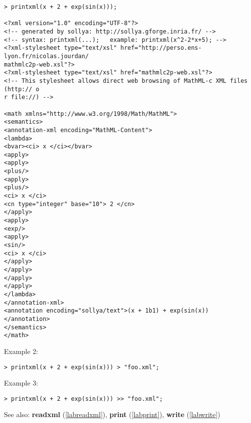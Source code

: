 \begin{center}\begin{minipage}{15cm}\begin{Verbatim}[frame=single]
> printxml(x + 2 + exp(sin(x)));

<?xml version="1.0" encoding="UTF-8"?>
<!-- generated by sollya: http://sollya.gforge.inria.fr/ -->
<!-- syntax: printxml(...);   example: printxml(x^2-2*x+5); -->
<?xml-stylesheet type="text/xsl" href="http://perso.ens-lyon.fr/nicolas.jourdan/
mathmlc2p-web.xsl"?>
<?xml-stylesheet type="text/xsl" href="mathmlc2p-web.xsl"?>
<!-- This stylesheet allows direct web browsing of MathML-c XML files (http:// o
r file://) -->

<math xmlns="http://www.w3.org/1998/Math/MathML">
<semantics>
<annotation-xml encoding="MathML-Content">
<lambda>
<bvar><ci> x </ci></bvar>
<apply>
<apply>
<plus/>
<apply>
<plus/>
<ci> x </ci>
<cn type="integer" base="10"> 2 </cn>
</apply>
<apply>
<exp/>
<apply>
<sin/>
<ci> x </ci>
</apply>
</apply>
</apply>
</apply>
</lambda>
</annotation-xml>
<annotation encoding="sollya/text">(x + 1b1) + exp(sin(x))</annotation>
</semantics>
</math>

\end{Verbatim}
\end{minipage}\end{center}
\noindent Example 2: 
\begin{center}\begin{minipage}{15cm}\begin{Verbatim}[frame=single]
> printxml(x + 2 + exp(sin(x))) > "foo.xml";
\end{Verbatim}
\end{minipage}\end{center}
\noindent Example 3: 
\begin{center}\begin{minipage}{15cm}\begin{Verbatim}[frame=single]
> printxml(x + 2 + exp(sin(x))) >> "foo.xml";
\end{Verbatim}
\end{minipage}\end{center}
See also: \textbf{readxml} (\ref{labreadxml}), \textbf{print} (\ref{labprint}), \textbf{write} (\ref{labwrite})
